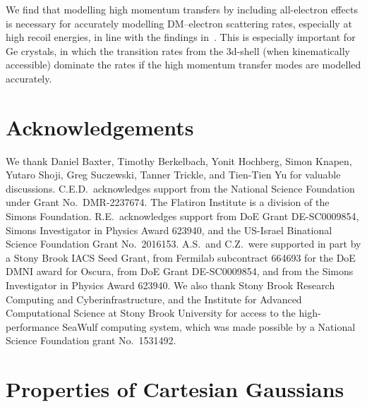 \documentclass[
    prd, twocolumn, superscriptaddress, nofootinbib, amsmath, amssymb,
    aps, floatfix,preprintnumbers
]{revtex4-2}
\begin{document}
    We find that modelling high momentum transfers by including all-electron effects is necessary for accurately modelling DM--electron scattering rates, especially at high recoil energies, in line with the findings in~\cite{Griffin21, Trickle2022}. This is especially important for Ge crystals, in which the transition rates from the 3d-shell (when kinematically accessible) dominate the rates if the high momentum transfer modes are modelled accurately.

\section*{Acknowledgements}
    We thank Daniel Baxter, Timothy Berkelbach, Yonit Hochberg, Simon Knapen, Yutaro Shoji, Greg Suczewski, Tanner Trickle, and Tien-Tien Yu for valuable discussions. C.E.D.~acknowledges support from the National Science Foundation under Grant No.~DMR-2237674. The Flatiron Institute is a division of the Simons Foundation.  R.E.~acknowledges support from DoE Grant DE-SC0009854, Simons Investigator in Physics Award 623940, and the US-Israel Binational Science Foundation Grant No.~2016153. A.S.~and C.Z.~were supported in part by a Stony Brook IACS Seed Grant, from Fermilab subcontract 664693 for the DoE DMNI award for Oscura, from DoE Grant DE-SC0009854, and from the Simons Investigator in Physics Award 623940. We also thank Stony Brook Research Computing and Cyberinfrastructure, and the Institute for Advanced Computational Science at Stony Brook University for access to the high-performance SeaWulf computing system, which was made possible by a National Science Foundation grant No.~1531492.



\clearpage 
\appendix

\section{Properties of Cartesian Gaussians}\label{app:cart_gauss}
\end{document}
